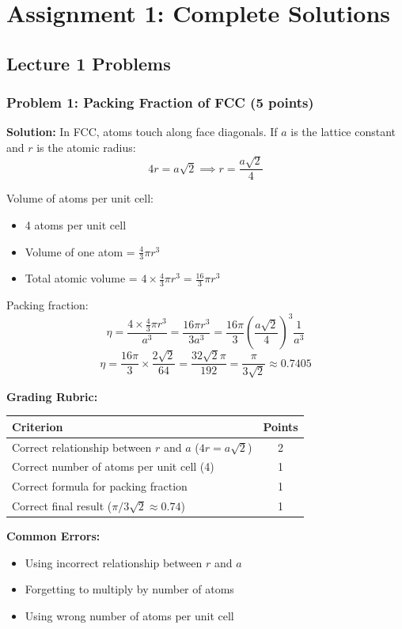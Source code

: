 \documentclass[12pt,a4paper]{article}
\begin{document}
\newpage

\section{Assignment 1: Complete Solutions}

\subsection*{Lecture 1 Problems}

\subsubsection*{Problem 1: Packing Fraction of FCC (5 points)}
\textbf{Solution:}
In FCC, atoms touch along face diagonals. If $a$ is the lattice constant and $r$ is the atomic radius:
\[4r = a\sqrt{2} \implies r = \frac{a\sqrt{2}}{4}\]

Volume of atoms per unit cell:
\begin{itemize}
    \item 4 atoms per unit cell
    \item Volume of one atom = $\frac{4}{3}\pi r^3$
    \item Total atomic volume = $4 \times \frac{4}{3}\pi r^3 = \frac{16}{3}\pi r^3$
\end{itemize}

Packing fraction:
\[\eta = \frac{4 \times \frac{4}{3}\pi r^3}{a^3} = \frac{16\pi r^3}{3a^3} = \frac{16\pi}{3} \left(\frac{a\sqrt{2}}{4}\right)^3 \frac{1}{a^3}\]
\[\eta = \frac{16\pi}{3} \times \frac{2\sqrt{2}}{64} = \frac{32\sqrt{2}\pi}{192} = \frac{\pi}{3\sqrt{2}} \approx 0.7405\]

\textbf{Grading Rubric:}
\begin{table}[h]
\centering
\begin{tabular}{|p{10cm}|c|}
\hline
\textbf{Criterion} & \textbf{Points} \\
\hline
Correct relationship between $r$ and $a$ ($4r = a\sqrt{2}$) & 2 \\
Correct number of atoms per unit cell (4) & 1 \\
Correct formula for packing fraction & 1 \\
Correct final result ($\pi/3\sqrt{2} \approx 0.74$) & 1 \\
\hline
\end{tabular}
\end{table}

\textbf{Common Errors:}
\begin{itemize}
    \item Using incorrect relationship between $r$ and $a$
    \item Forgetting to multiply by number of atoms
    \item Using wrong number of atoms per unit cell
\end{itemize}
\end{document}
